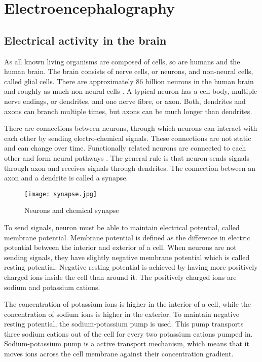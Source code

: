 
\chapter{Electroencephalography}
\section{Electrical activity in the brain}
\label{sec:neuron}

As all known living organisms are composed of cells, so are humans and the human brain. The brain consists of nerve cells, or neurons, and non-neural cells, called glial cells. There are approximately 86 billion neurons in the human brain and roughly as much non-neural cells \cite{neuroncount}. A typical neuron has a cell body, multiple nerve endings, or dendrites, and one nerve fibre, or axon. Both, dendrites and axons can branch multiple times, but axons can be much longer than dendrites. 

There are connections between neurons, through which neurons can interact with each other by sending electro-chemical signals. These connections are not static and can change over time. Functionally related neurons are connected to each other and form neural pathways \cite{neuralpathway}. The general rule is that neuron sends signals through axon and receives signals through dendrites. The connection between an axon and a dendrite is called a synapse. 

\begin{figure}[b!]
\centering
\texttt{[image: synapse.jpg]}
\caption{Neurons and chemical synapse\cite[p.~17]{neuronpic}}
\label{fig:synapse}
\end{figure}

To send signals, neuron must be able to maintain electrical potential, called membrane potential. Membrane potential is defined as the difference in electric potential between the interior and exterior of a cell. When neurons are not sending signals, they have slightly negative membrane potential which is called resting potential. Negative resting potential is achieved by having more positively charged ions inside the cell than around it. The positively charged ions are sodium and potassium cations.

The concentration of potassium ions is higher in the interior of a cell, while the concentration of sodium ions is higher in the exterior. To maintain negative resting potential, the sodium-potassium pump is used. This pump transports three sodium cations out of the cell for every two potassium cations pumped in. Sodium-potassium pump is a active transport mechanism, which means that it moves ions across the cell membrane against their concentration gradient.

